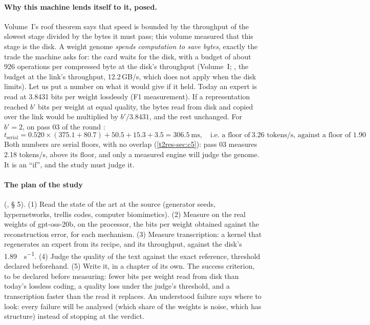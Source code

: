 \paragraph{Why this machine lends itself to it, posed.} Volume~I's roof theorem says that speed is bounded by the throughput of the slowest stage divided by the bytes it must pass; this volume measured that this stage is the disk. A weight genome \emph{spends computation to save bytes}, exactly the trade the machine asks for: the card waits for the disk, with a budget of about 926 operations per compressed byte at the disk's throughput (Volume~I; , the budget at the link's throughput, 12.2\,GB/s, which does not apply when the disk limits). Let us put a number on what it would give if it held. Today an expert is read at \num{3.8431} bits per weight losslessly (F1 measurement). If a representation reached $b'$ bits per weight at equal quality, the bytes read from disk and copied over the link would be multiplied by $b'/3.8431$, and the rest unchanged. For $b' = 2$, on pass 03 of the round \calc:
\[
t_{\text{serial}} = 0.520 \times (375.1 + 80.7) + 50.5 + 15.3 + 3.5 = \SI{306.5}{\milli\second}, \quad \text{i.e.\ a floor of} \ \num{3.26} \text{ tokens/s, against a floor of } \num{1.90}
\]
Both numbers are serial floors, with no overlap (\cref{t2res-sec:c5}): pass 03 measures \num{2.18} tokens/s, above its floor, and only a measured engine will judge the genome. It is an ``if'', and the study must judge it.

\paragraph{The plan of the study} (, § 5). (1) Read the state of the art at the source (generator seeds, hypernetworks, trellis codes, computer biomimetics). (2) Measure on the real weights of gpt-oss-20b, on the processor, the bits per weight obtained against the reconstruction error, for each mechanism. (3) Measure transcription: a kernel that regenerates an expert from its recipe, and its throughput, against the disk's \SI{1.89}{\Go\per\second}. (4) Judge the quality of the text against the exact reference, threshold declared beforehand. (5) Write it, in a chapter of its own. The success criterion, to be declared before measuring: fewer bits per weight read from disk than today's lossless coding, a quality loss under the judge's threshold, and a transcription faster than the read it replaces. An understood failure says where to look: every failure will be analysed (which share of the weights is noise, which has structure) instead of stopping at the verdict.

